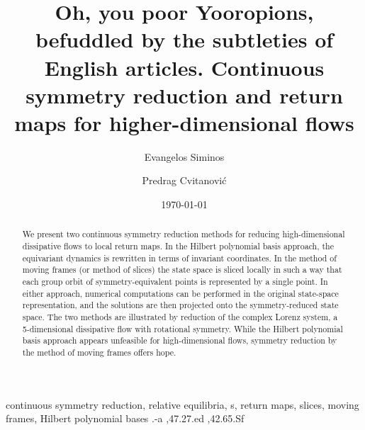 \documentclass[preprint,number,sort&compress]{elsarticle}
\begin{document}
\begin{frontmatter}

\ifdraft
			\title{
Oh, you poor Yooropions, befuddled by the subtleties of English articles.
			}
\else
			\title{
Continuous symmetry reduction and return maps for higher-dimensional flows
			}
\fi

\author{Evangelos Siminos}
\author{Predrag Cvitanovi\'c}
\address{Center for Nonlinear Science,
School of Physics, Georgia Institute of Technology,
Atlanta, GA 30332-0430}

\date{\today}

        \begin{abstract}
We present two continuous symmetry reduction methods for
reducing high-dimensional dissipative flows to local return
maps. In the Hilbert polynomial basis approach, the equi\-vari\-ant
dynamics is rewritten in terms of in\-vari\-ant coordinates. In the
method of moving frames (or method of slices) the state space
is sliced locally in such a way that each group orbit of
symmetry-equivalent points is represented by a single point. In
either approach, numerical computations can be performed in the
original state-space representation, and the solutions are then
projected onto the symmetry-reduced state space. The two methods
are illustrated by reduction of the complex Lorenz system, a
5-dimensional dissipative flow with rotational symmetry. While
the Hilbert polynomial basis approach appears unfeasible for
high-dimensional flows, symmetry reduction by the method of
moving frames offers hope.
        \end{abstract}

\begin{keyword}
continuous symmetry reduction,
relative equilibria,
\rpo s,
return maps,
slices,
moving frames,
Hilbert polynomial bases
.-a \sep 47.27.ed \sep 42.65.Sf
\end{keyword}
\end{frontmatter}
\end{document}
